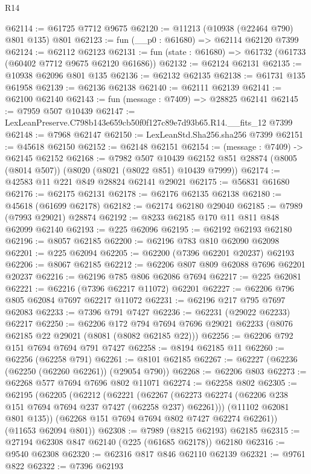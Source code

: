 \begin{lexlean}{R14}
\begin{coremodule}
@62114 := @61725 @7712 @9675
@62120 := @11213 (@10938 (@22464 @790) @801 @135) @801
@62123 := fun (__p0 : @61680) => @62114 @62120 @7399
@62124 := @62112 @62123
@62131 := fun (state : @61680) => @61732 (@61733 (@60402 @7712 @9675 @62120 @61686))
@62132 := @62124 @62131
@62135 := @10938 @62096 @801 @135
@62136 := @62132 @62135
@62138 := @61731 @135 @61958
@62139 := @62136 @62138
@62140 := @62111 @62139
@62141 := @62100 @62140
@62143 := fun (message : @7409) => @28825 @62141
@62145 := @7959 @507 @10439
@62147 := LexLeanPreserve.C798b143e659cb50f0f127c89e7d93b65.R14.__fits_12 @7399
@62148 := @7968 @62147
@62150 := LexLeanStd.Sha256.sha256 @7399
@62151 := @45618 @62150
@62152 := @62148 @62151
@62154 := (message : @7409) -> @62145 @62152
@62168 := @7982
    @507
    @10439
    @62152
    @851
    @28874
    (@8005 (@8014 @507))
    (@8020 (@8021 (@8022 @851) @10439 @7999))
@62174 := @42583 @11 @221 @849 @28824 @62141 @29021
@62175 := @56831 @61680
@62176 := @62175 @62131
@62178 := @62176 @62135 @62138
@62180 := @45618 (@61699 @62178)
@62182 := @62174 @62180 @29040
@62185 := @7989 (@7993 @29021) @28874
@62192 := @8233 @62185 @170 @11 @811 @848 @62099 @62140
@62193 := @225 @62096
@62195 := @62192 @62193 @62180
@62196 := @8057 @62185
@62200 := @62196 @783 @810 @62090 @62098
@62201 := @225 @62094
@62205 := @62200 (@7396 @62201 @20237) @62193
@62206 := @8067 @62185
@62212 := @62206 @807 @809 @62088 @7696 @62201 @20237
@62216 := @62196 @785 @806 @62086 @7694
@62217 := @225 @62081
@62221 := @62216 (@7396 @62217 @11072) @62201
@62227 := @62206 @796 @805 @62084 @7697 @62217 @11072
@62231 := @62196 @217 @795 @7697 @62083
@62233 := @7396 @791 @7427
@62236 := @62231 (@29022 @62233) @62217
@62250 := @62206
    @172
    @794
    @7694
    @7696
    @29021
    @62233
    (@8076 @62185 @22 @29021 (@8081 (@8082 @62185 @22)))
@62256 := @62206 @792 @151 @7694 @7694 @791 @7427
@62258 := @8194 @62185 @11
@62260 := @62256 (@62258 @791)
@62261 := @8101 @62185
@62267 := @62227 (@62236 (@62250 (@62260 @62261)) (@29054 @790))
@62268 := @62206 @803
@62273 := @62268 @577 @7694 @7696 @802 @11071
@62274 := @62258 @802
@62305 := @62195
    (@62205
      (@62212
        (@62221
          (@62267 (@62273 @62274 (@62206 @238 @151 @7694 @7694 @237 @7427 (@62258 @237) @62261)))
          (@11102 @62081 @801 @135))
        (@62268 @151 @7694 @7694 @802 @7427 @62274 @62261))
      (@11653 @62094 @801))
@62308 := @7989 (@8215 @62193) @62185
@62315 := @27194 @62308 @847 @62140 (@225 (@61685 @62178)) @62180
@62316 := @9540 @62308
@62320 := @62316 @817 @846 @62110 @62139
@62321 := @9761 @822
@62322 := @7396 @62193

\end{coremodule}
\end{lexlean}
